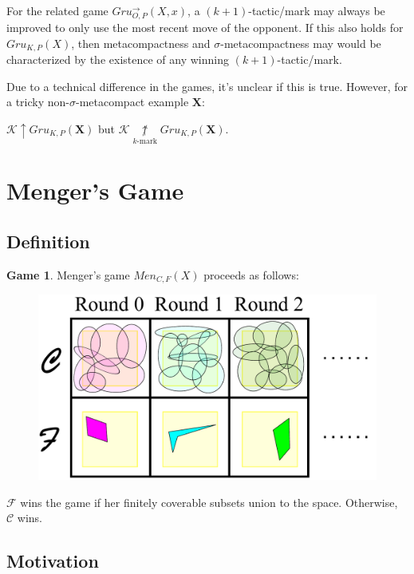 \documentclass{beamer}
\theoremstyle{definition}
\newtheorem{game}[theorem]{Game}
\newcommand{\win}{\uparrow}
\newcommand{\notkmarkwin}[1]{\underset{#1\text{-mark}}{\not\uparrow}}
\newcommand{\gruConGame}[2]{Gru_{O,P}^{\to}\left({#1},{#2}\right)}
\newcommand{\gruKPGame}[1]{Gru_{K,P}\left({#1}\right)}
\newcommand{\menGame}[1]{Men_{C,F}\left({#1}\right)}
\newcommand{\<}{\langle}
\renewcommand{\>}{\rangle}
\newcommand{\pl}[1]{\mathscr{#1}}
\begin{document}
\begin{frame}
  For the related game $\gruConGame{X}{x}$, a $(k+1)$-tactic/mark may always
  be improved to only use the most recent move of the opponent. If this
  also holds for $\gruKPGame{X}$, then metacompactness and
  $\sigma$-metacompactness may would be characterized by the existence
  of any winning $(k+1)$-tactic/mark.

  \vpause

  Due to a technical difference in the games, it's unclear if this is true.
  However, for a tricky non-$\sigma$-metacompact example $\pmb X$:

  \begin{theorem}
    $\pl K\win\gruKPGame{\pmb X}$ but
    $\pl K\notkmarkwin{k}\gruKPGame{\pmb X}$.
  \end{theorem}
\end{frame}





\section{Menger's Game}

\subsection{Definition}

\begin{frame}
  \small
  \begin{game}
  Menger's game $\menGame{X}$ proceeds as follows:
    \begin{figure}
      \includegraphics[width=0.6\linewidth]{mengerGame.pdf}
    \end{figure}

  $\pl F$ wins the game if her finitely coverable subsets
  union to the space. Otherwise, $\pl C$  wins.
  \end{game}
\end{frame}

\subsection{Motivation}
\end{document}
